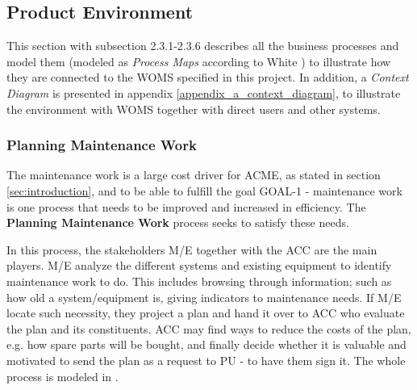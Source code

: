 \subsection{Product Environment}
\label{sec:product_environment}
This section with subsection 2.3.1-2.3.6 describes all the business processes and model them (modeled as \emph{Process Maps} according to White \cite{bpmn}) to illustrate how they are connected to the WOMS specified in this project. In addition, a \emph{Context Diagram} is presented in appendix \ref{appendix_a_context_diagram}, to illustrate the environment with WOMS together with direct users and other systems. 
\subsubsection{Planning Maintenance Work}
\label{sec:bp1}
The maintenance work is a large cost driver for ACME, as stated in section \ref{sec:introduction}, and to be able to fulfill the goal GOAL-1 - maintenance work is one process that needs to be improved and increased in efficiency. The \textbf{Planning Maintenance Work} process seeks to satisfy these needs. 

In this process, the stakeholders M/E together with the ACC are the main players. M/E analyze the different systems and existing equipment to identify maintenance work to do. This includes browsing through information; such as how old a system/equipment is, giving indicators to maintenance needs. If M/E locate such necessity, they project a plan and hand it over to ACC who evaluate the plan and its constituents. ACC may find ways to reduce the costs of the plan, e.g. how spare parts will be bought, and finally decide whether it is valuable and motivated to send the plan as a request to PU - to have them sign it. The whole process is modeled in .

